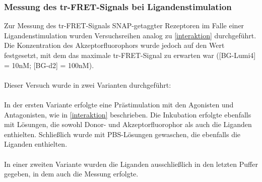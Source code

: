 \subsubsection{Messung des tr-FRET-Signals bei Ligandenstimulation}

Zur Messung des tr-FRET-Signals SNAP-getaggter Rezeptoren im Falle einer Ligandenstimulation wurden Versuchsreihen analog zu \ref{interaktion} durchgeführt. Die Konzentration des Akzeptorfluorophors wurde jedoch auf den Wert festgesetzt, mit dem das maximale tr-FRET-Signal zu erwarten war ([BG-Lumi4] = 10\si{\nano M}; [BG-d2] = 100\si{\nano M}).
\\ \\
Dieser Versuch wurde in zwei Varianten durchgeführt:
\\ \\
In der ersten Variante erfolgte eine Prästimulation mit den Agonisten und Antagonisten, wie in \ref{interaktion} beschrieben. Die Inkubation erfolgte ebenfalls mit Lösungen, die sowohl Donor- und Akzeptorfluorophor als auch die Liganden enthielten. Schließlich wurde mit PBS-Lösungen gewaschen, die ebenfalls die Liganden enthielten.
\\ \\
In einer zweiten Variante wurden die Liganden ausschließlich in den letzten Puffer gegeben, in dem auch die Messung erfolgte.

